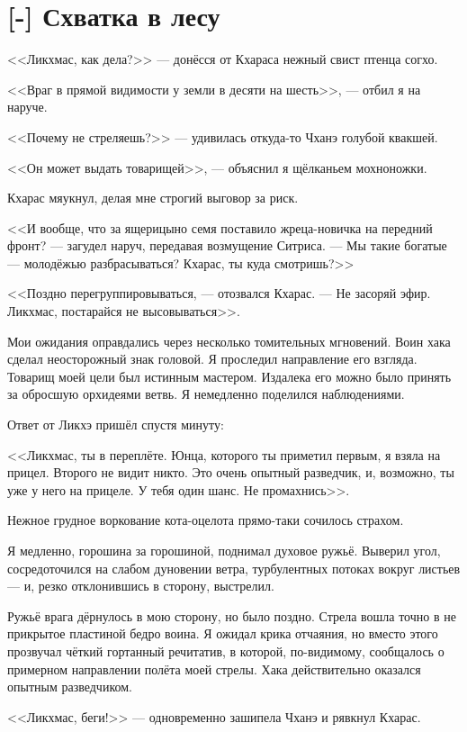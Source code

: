 \section{[-] Схватка в лесу}

\textspace

<<Ликхмас, как дела?>> --- донёсся от Кхараса нежный свист птенца согхо.

<<Враг в прямой видимости у земли в десяти на шесть>>, --- отбил я на наруче.

<<Почему не стреляешь?>> --- удивилась откуда-то Чханэ голубой квакшей.

<<Он может выдать товарищей>>, --- объяснил я щёлканьем мохноножки.

Кхарас мяукнул, делая мне строгий выговор за риск.

<<И вообще, что за ящерицыно семя поставило жреца-новичка на передний фронт? --- загудел наруч, передавая возмущение Ситриса.
--- Мы такие богатые --- молодёжью разбрасываться?
Кхарас, ты куда смотришь?>>

<<Поздно перегруппировываться, --- отозвался Кхарас.
--- Не засоряй эфир.
Ликхмас, постарайся не высовываться>>.

Мои ожидания оправдались через несколько томительных мгновений.
Воин хака сделал неосторожный знак головой.
Я проследил направление его взгляда.
Товарищ моей цели был истинным мастером.
Издалека его можно было принять за обросшую орхидеями ветвь.
Я немедленно поделился наблюдениями.

Ответ от Ликхэ пришёл спустя минуту:

<<Ликхмас, ты в переплёте.
Юнца, которого ты приметил первым, я взяла на прицел.
Второго не видит никто.
Это очень опытный разведчик, и, возможно, ты уже у него на прицеле.
У тебя один шанс.
Не промахнись>>.

Нежное грудное воркование кота-оцелота прямо-таки сочилось страхом.

Я медленно, горошина за горошиной, поднимал духовое ружьё.
Выверил угол, сосредоточился на слабом дуновении ветра, турбулентных потоках вокруг листьев --- и, резко отклонившись в сторону, выстрелил.

Ружьё врага дёрнулось в мою сторону, но было поздно.
Стрела вошла точно в не прикрытое пластиной бедро воина.
Я ожидал крика отчаяния, но вместо этого прозвучал чёткий гортанный речитатив, в которой, по-видимому, сообщалось о примерном направлении полёта моей стрелы.
Хака действительно оказался опытным разведчиком.

<<Ликхмас, беги!>> --- одновременно зашипела Чханэ и рявкнул Кхарас.

